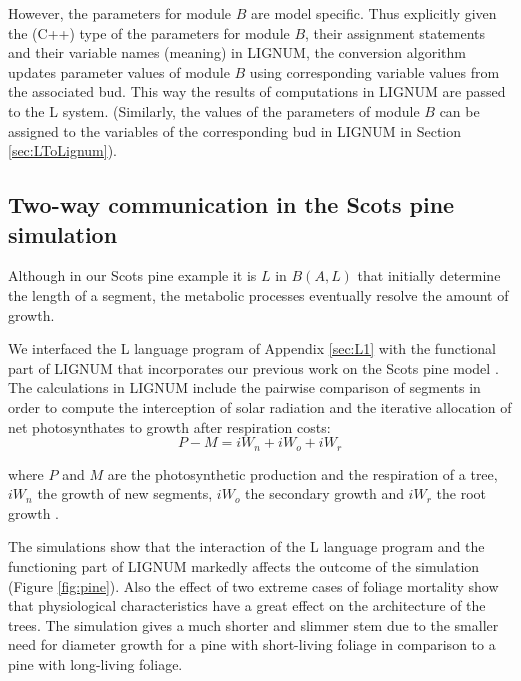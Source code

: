 However,  the parameters  for  module $B$  are  model specific.   Thus
explicitly  given the  (C++) type  of the  parameters for  module $B$,
their  assignment statements  and  their variable  names (meaning)  in
LIGNUM, the  conversion algorithm  updates parameter values  of module
$B$ using corresponding variable values from the associated bud.  This
way the results of computations in  LIGNUM are passed to the L system.
(Similarly, the values of the parameters of module $B$ can be assigned
to  the  variables of  the  corresponding  bud  in LIGNUM  in  Section
\ref{sec:LToLignum}).

\subsection{Two-way communication in the Scots pine simulation}

Although  in  our  Scots pine  example  it  is  $L$ in  $B(A,L)$  that
initially determine  the length of a segment,  the metabolic processes
eventually resolve the amount of growth.
  
We interfaced the L language program of Appendix \ref{sec:L1} with the
functional part of  LIGNUM that incorporates our previous  work on the
Scots pine model \citep{perttunen:96, perttunen:98}.  The calculations
in  LIGNUM include  the pairwise  comparison of  segments in  order to
compute  the  interception  of   solar  radiation  and  the  iterative
allocation of  net photosynthates  to growth after  respiration costs:
\begin{equation} P - M = iW_n + iW_o + iW_r \end{equation}

where  $P$   and  $M$  are  the  photosynthetic   production  and  the
respiration of a  tree, $iW_n$ the growth of  new segments, $iW_o$ the
secondary      growth     and      $iW_r$     the      root     growth
\citep[c.f.][]{perttunen:96,perttunen:01}.

The simulations  show that the  interaction of the L  language program
and the functioning part of LIGNUM markedly affects the outcome of the
simulation (Figure  \ref{fig:pine}).  Also  the effect of  two extreme
cases  of foliage  mortality show  that  physiological characteristics
have a great effect on  the architecture of the trees.  The simulation
gives a  much shorter  and slimmer  stem due to  the smaller  need for
diameter growth for a pine  with short-living foliage in comparison to
a pine with long-living foliage.

